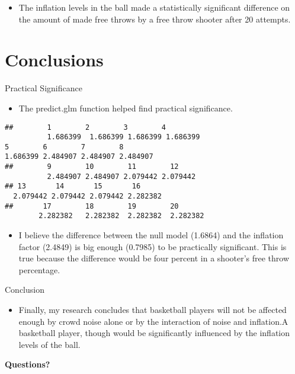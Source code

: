 \documentclass[ignorenonframetext,]{beamer}
\providecommand{\tightlist}{%
\setlength{\itemsep}{0pt}\setlength{\parskip}{0pt}}
\begin{document}
\begin{frame}
\begin{itemize}
\tightlist
\item
  The inflation levels in the ball made a statistically significant difference on the amount of
  made free throws by a free throw shooter after 20 attempts.
\end{itemize}
\end{frame}

\section{Conclusions}\label{conclusions}

\begin{frame}[fragile]{Practical Significance}

\begin{itemize}
\tightlist
\item The predict.glm function helped find practical significance.
\end{itemize}

\begin{verbatim}
##        1        2        3        4
          1.686399  1.686399 1.686399 1.686399
5        6        7        8 
1.686399 2.484907 2.484907 2.484907 
##        9        10        11        12      
          2.484907 2.484907 2.079442 2.079442
## 13       14       15       16 
  2.079442 2.079442 2.079442 2.282382 
##       17        18        19        20 
        2.282382   2.282382  2.282382  2.282382
\end{verbatim}

\begin{itemize}
\tightlist
\item
  I believe the difference between the null model (1.6864) and the
  inflation factor (2.4849) is big enough (0.7985) to be practically
  significant. This is true because the difference would be 
  four percent in a shooter's free throw percentage.
\end{itemize}

\end{frame}

\begin{frame}{Conclusion}

\begin{itemize}
\tightlist
\item
  Finally, my research concludes that basketball players will not be
  affected enough by crowd noise alone or by the interaction of noise
  and inflation.A basketball player, though would be significantly influenced by
  the inflation levels of the ball. 
\end{itemize}

\end{frame}

\begin{frame}{}

\begin{center}
\textbf{Questions?}
\end{center}

\end{frame}
\end{document}
